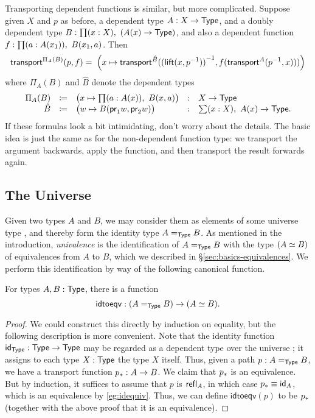 Transporting dependent functions is similar, but more complicated.
Suppose given $X$ and $p$ as before, a dependent type $A:X\to \type$, and a doubly dependent type $B:\prd{x:X} (A(x)\to\type)$, and also a dependent function $f : \prd{a:A(x_1)} B(x_1,a)$.
Then
\begin{align*}
  \transfib{\Pi_A(B)}{p}{f} =
  \;\Big(x \mapsto \transfib{\hat{B}}{\opp{(\mathsf{lift}(x,\opp{p}))}}{f (\transfib{A}{\opp p}x)}\Big)
\end{align*}
where $\Pi_A(B)$ and $\hat{B}$ denote the dependent types
\[
\begin{array}{rclcl}
\Pi_A(B) &\defeq& \big(x\mapsto \prd{a:A(x)} B(x,a) \big) &:& X\to \type\\
\hat{B} &\defeq& \big(w \mapsto B(\proj1w,\proj2w) \big) &:& \sm{x:X} A(x) \to \type.
\end{array}
\]
If these formulas look a bit intimidating, don't worry about the details.
The basic idea is just the same as for the non-dependent function type: we transport the argument backwards, apply the function, and then transport the result forwards again.


\subsection{The Universe}
\label{sec:compute-universe}

Given two types $A$ and $B$, we may consider them as elements of some universe type \type, and thereby form the identity type $\id[\type]AB$.
As mentioned in the introduction, \emph{univalence} is the identification of $\id[\type]AB$ with the type $(\eqv AB)$ of equivalences from $A$ to $B$, which we described in \S\ref{sec:basics-equivalences}.
We perform this identification by way of the following canonical function.

\begin{lem}
  For types $A,B:\type$, there is a function
  \begin{equation}\label{eq:uidtoeqv}
    \mathsf{idtoeqv} : (\id[\type]AB) \to (\eqv A B).
  \end{equation}
\end{lem}
\begin{proof}
  We could construct this directly by induction on equality, but the following description is more convenient.
  Note that the identity function $\idfunc[\type]:\type\to\type$ may be regarded as a dependent type over the universe \type; it assigns to each type $X:\type$ the type $X$ itself.
  Thus, given a path $p:A =_\type B$, we have a transport function $\transf{p}:A \to B$.
  We claim that $\transf{p}$ is an equivalence.
  But by induction, it suffices to assume that $p$ is $\refl A$, in which case $\transf{p} \jdeq \idfunc[A]$, which is an equivalence by \autoref{eg:idequiv}.
  Thus, we can define $\mathsf{idtoeqv}(p)$ to be $\transf{p}$ (together with the above proof that it is an equivalence).
\end{proof}

